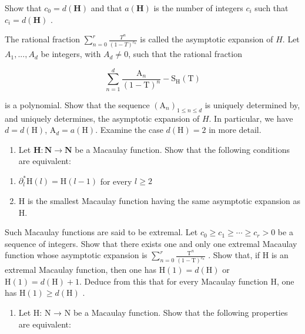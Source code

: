 Show that \(c_0 = d(\mathbf{H})\) and that \(a(\mathbf{H})\) is the number of integers \(c_i\) such that \(c_i = d(\mathbf{H})\) .

The rational fraction \(\sum_{n=0}^{r}\frac{T^n}{(1-T)^{c_n}}\) is called the asymptotic expansion of \(H\). Let \(A_1, ..., A_d\) be integers, with \(A_d \neq 0\), such that the rational fraction

\[
\sum_ {n = 1} ^ {d} \frac {\mathrm{A} _ {n}}{(1 - \mathrm{T}) ^ {n}} - \mathrm{S} _ {\mathrm{H}} (\mathrm{T})
\]

is a polynomial. Show that the sequence \((\mathrm{A}_{n})_{1\leq n\leq d}\) is uniquely determined by, and uniquely determines, the asymptotic expansion of \(H\). In particular, we have \(d=d(\mathrm{H})\), \(\mathrm{A}_{d}=a(\mathrm{H})\). Examine the case \(d(\mathrm{H})=2\) in more detail.

\begin{enumerate}
\def\labelenumi{\alph{enumi})}
\setcounter{enumi}{3}
\tightlist
\item
  Let \(\mathbf{H}:\mathbf{N}\to\mathbf{N}\) be a Macaulay function. Show that the following conditions are equivalent:
\end{enumerate}

\begin{enumerate}
\def\labelenumi{(\roman{enumi})}
\item
  \(\partial_l^*\mathrm{H}(l) = \mathrm{H}(l - 1)\) for every \(l\geqslant 2\)
\item
  H is the smallest Macaulay function having the same asymptotic expansion as H.
\end{enumerate}

Such Macaulay functions are said to be extremal. Let \(c_{0} \geqslant c_{1} \geqslant \cdots \geqslant c_{r} > 0\) be a sequence of integers. Show that there exists one and only one extremal Macaulay function whose asymptotic expansion is \(\sum_{n=0}^{r} \frac{\mathrm{T}^{n}}{(1 - \mathrm{T})^{c_{n}}}\) . Show that, if H is an extremal Macaulay function, then one has \(\mathrm{H}(1) = d(\mathrm{H})\) or \(\mathrm{H}(1) = d(\mathrm{H}) + 1\). Deduce from this that for every Macaulay function H, one has \(\mathrm{H}(1) \geqslant d(\mathrm{H})\) .

\begin{enumerate}
\def\labelenumi{\alph{enumi})}
\setcounter{enumi}{4}
\tightlist
\item
  Let H: N → N be a Macaulay function. Show that the following properties are equivalent:
\end{enumerate}

